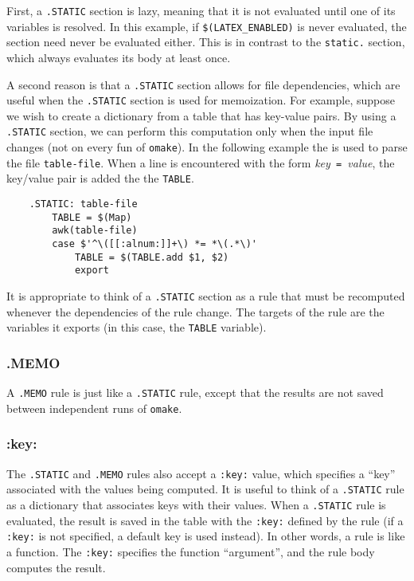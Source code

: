 First, a \verb+.STATIC+ section is lazy, meaning that it is not evaluated until one of its variables
is resolved.  In this example, if \verb+$(LATEX_ENABLED)+ is never evaluated, the section need never
be evaluated either.  This is in contrast to the \verb+static.+ section, which always evaluates its
body at least once.

A second reason is that a \verb+.STATIC+ section allows for file dependencies, which are useful when
the \verb+.STATIC+ section is used for memoization.  For example, suppose we wish to create a
dictionary from a table that has key-value pairs.  By using a \verb+.STATIC+ section, we can perform
this computation only when the input file changes (not on every fun of \verb+omake+).  In the
following example the  is used to parse the file \verb+table-file+.
When a line is encountered with the form \textit{key}\verb+ = +\textit{value}, the key/value pair is
added the the \verb+TABLE+.

\begin{verbatim}
    .STATIC: table-file
        TABLE = $(Map)
        awk(table-file)
        case $'^\([[:alnum:]]+\) *= *\(.*\)'
            TABLE = $(TABLE.add $1, $2)
            export
\end{verbatim}

It is appropriate to think of a \verb+.STATIC+ section as a rule that must be recomputed whenever
the dependencies of the rule change.  The targets of the rule are the variables it exports (in this
case, the \verb+TABLE+ variable).

\subsubsection{.MEMO}
\label{section:.MEMO}

A \verb+.MEMO+ rule is just like a \verb+.STATIC+ rule, except that the results are not saved
between independent runs of \verb+omake+.

\subsubsection{:key:}

The \verb+.STATIC+ and \verb+.MEMO+ rules also accept a \verb+:key:+ value, which specifies a
``key'' associated with the values being computed.  It is useful to think of a \verb+.STATIC+ rule
as a dictionary that associates keys with their values.  When a \verb+.STATIC+ rule is evaluated,
the result is saved in the table with the \verb+:key:+ defined by the rule (if a \verb+:key:+ is not
specified, a default key is used instead).  In other words, a rule is like a function.  The
\verb+:key:+ specifies the function ``argument'', and the rule body computes the result.

